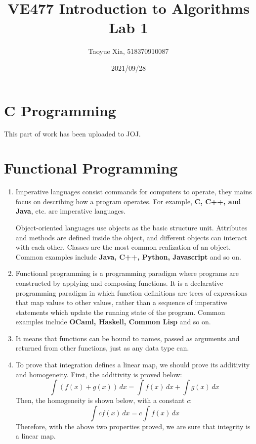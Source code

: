 \documentclass[12pt, a4paper]{article}
\title{
    VE477 Introduction to Algorithms\\ 
    Lab 1}
\author{Taoyue Xia, 518370910087}
\date{2021/09/28}
\begin{document}
\maketitle

\section{C Programming}

This part of work has been uploaded to JOJ.

\section{Functional Programming}
\begin{enumerate}
    \item Imperative languages consist commands for computers to operate, they mains focus on describing how a program operates. 
          For example, \textbf{C, C++, and Java}, etc. are imperative languages.

          Object-oriented languages use objects as the basic structure unit. Attributes and methods are defined inside the object, 
          and different objects can interact with each other. Classes are the most common realization of an object. 
          Common examples include \textbf{Java, C++, Python, Javascript} and so on.

    \item Functional programming is a programming paradigm where programs are constructed by applying and composing functions. 
          It is a declarative programming paradigm in which function definitions are trees of expressions that map values to other values, 
          rather than a sequence of imperative statements which update the running state of the program.
          Common examples include \textbf{OCaml, Haskell, Common Lisp} and so on.

    \item It means that functions can be bound to names, passed as arguments and returned from other functions, just as any data type can.
    
    \item To prove that integration defines a linear map, we should prove its additivity and homogeneity. 
          First, the additivity is proved below:
          $$\int (f(x) + g(x))\, dx = \int f(x)\, dx + \int g(x)\, dx$$
          Then, the homogeneity is shown below, with a constant $c$:
          $$\int cf(x)\, dx = c\int f(x)\, dx$$
          Therefore, with the above two properties proved, we are sure that integrity is a linear map.


\end{enumerate}
\end{document}
